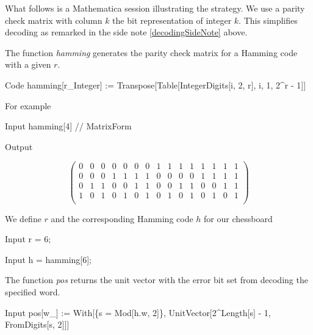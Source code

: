 \begin{fullwidth}

What follows is a Mathematica session illustrating the strategy. We use a parity check matrix with column $k$ the bit representation of integer $k$. This simplifies decoding as remarked in the side note \ref{decodingSideNote} above.

The function \textit{hamming} generates the parity check matrix for a Hamming code with a given $r$.

\begin{mmaCell}[morefunctionlocal={i},morepattern={r, r_Integer}]{Code}
  hamming[r_Integer] := Transpose[Table[IntegerDigits[i, 2, r], {i, 1, 2^r - 1}]]
\end{mmaCell}

For example

\begin{mmaCell}[moredefined={hamming}]{Input}
  hamming[4] // MatrixForm
\end{mmaCell}

\begin{mmaCell}{Output}
\\
\end{mmaCell}
$$
\left(
\begin{array}{ccccccccccccccc}
 0 & 0 & 0 & 0 & 0 & 0 & 0 & 1 & 1 & 1 & 1 & 1 & 1 & 1 & 1 \\
 0 & 0 & 0 & 1 & 1 & 1 & 1 & 0 & 0 & 0 & 0 & 1 & 1 & 1 & 1 \\
 0 & 1 & 1 & 0 & 0 & 1 & 1 & 0 & 0 & 1 & 1 & 0 & 0 & 1 & 1 \\
 1 & 0 & 1 & 0 & 1 & 0 & 1 & 0 & 1 & 0 & 1 & 0 & 1 & 0 & 1 \\
\end{array}
\right)
$$


We define $r$ and the corresponding Hamming code $h$ for our chessboard

\begin{mmaCell}{Input}
  r = 6;
\end{mmaCell}

\begin{mmaCell}[moredefined={hamming}]{Input}
  h = hamming[6];
\end{mmaCell}

The function \textit{pos} returns the unit vector with the error bit set from decoding the specified word.

\begin{mmaCell}[morelocal={s},morepattern={w, w_}]{Input}
  pos[w_] := With[\{s = Mod[h.w, 2]\}, UnitVector[2^Length[s] - 1, FromDigits[s, 2]]]
\end{mmaCell}


\end{fullwidth}
